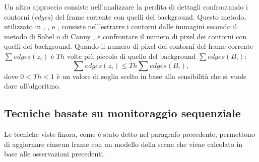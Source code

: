 Un altro approccio consiste nell'analizzare la perdita di dettagli confrontando i contorni (\textit{edges}) del frame corrente con quelli del background.
Questo metodo, utilizzato in \cite{ellwart2012camera}, \cite{gil2007automatic}, \cite{harasse2004automated} e \cite{kryjak2012fpga}, consiste nell'estrarre i contorni dalle immagini secondo il metodo di Sobel \cite{sobel19683x3} o di Canny \cite{canny1986computational}, e confrontare il numero di pixel dei contorni con quelli del background. 
Quando il numero di pixel dei contorni del frame corrente $\sum edges(z_i)$ \`e $Th$ volte pi\`u piccolo di quello del background $\sum edges(B_i)$:
\[ \sum edges(z_i) \leq Th \sum edges(B_i), \]
dove $0<Th<1$ \`e  un valore di soglia scelto in base alla sensibilit\`a che si vuole dare all'algoritmo.
\subsection{Tecniche basate su monitoraggio sequenziale}
Le tecniche viste finora, come \`e stato detto nel paragrafo precedente, permettono di aggiornare ciascun frame con un modello della scena che viene calcolato in base alle osservazioni precedenti.
